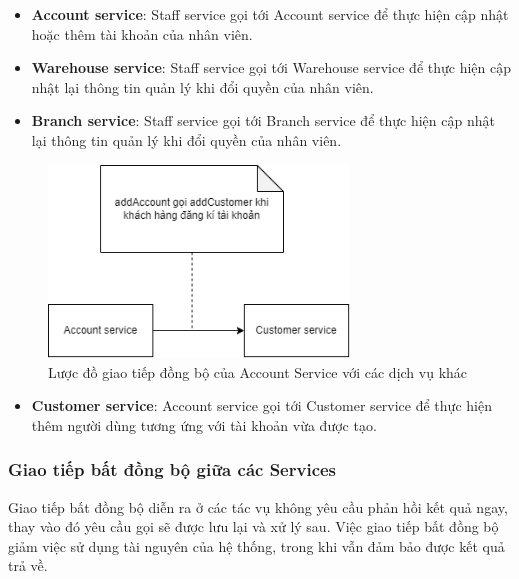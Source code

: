 \begin{itemize}
	\item \textbf{Account service}: Staff service gọi tới Account service để thực hiện cập nhật hoặc thêm tài khoản của nhân viên.
	\item \textbf{Warehouse service}: Staff service gọi tới Warehouse service để thực hiện cập nhật lại thông tin quản lý khi đổi quyền của nhân viên.
	\item \textbf{Branch service}: Staff service gọi tới Branch service để thực hiện cập nhật lại thông tin quản lý khi đổi quyền của nhân viên.
\end{itemize}

\begin{figure}[!htp]
	\centering
	\includegraphics[width=8cm]{img/Architecture/service/account-call.png}
	\newline
	\caption{Lược đồ giao tiếp đồng bộ của Account Service với các dịch vụ khác}
\end{figure}

\begin{itemize}
	\item \textbf{Customer service}: Account service gọi tới Customer service để thực hiện thêm người dùng tương ứng với tài khoản vừa được tạo.
\end{itemize}

\subsubsection{Giao tiếp bất đồng bộ giữa các Services}


\hspace*{0.5cm} Giao tiếp bất đồng bộ diễn ra ở các tác vụ không yêu cầu phản hồi kết quả ngay, thay vào đó yêu cầu gọi sẽ được lưu lại và xử lý sau. Việc giao tiếp bất đồng bộ giảm việc sử dụng tài nguyên của hệ thống, trong khi vẫn đảm bảo được kết quả trả về.

